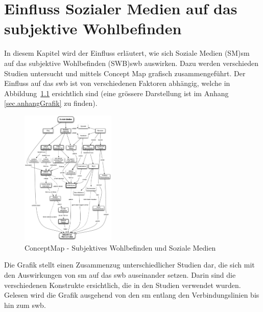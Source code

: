 %
%
\thispagestyle{empty}
\chapter{Einfluss Sozialer Medien auf das subjektive Wohlbefinden}\label{chap.einfluss}
\glsresetall
In diesem Kapitel wird der Einfluss erläutert, wie sich Soziale Medien (SM)\gls{sm} auf das subjektive Wohlbefinden (SWB)\gls{swb} auswirken. Dazu werden verschieden Studien untersucht und mittels Concept Map grafisch zusammengeführt. Der Einfluss auf das \gls{swb} ist von verschiedenen Faktoren abhängig, welche in Abbildung~\ref{fig.ConceptMapSwbSm} ersichtlich sind (eine grössere Darstellung ist im Anhang \ref{sec.anhangGrafik} zu finden).
\begin{figure}[h]
	\centering
		\includegraphics[width=0.4\textwidth]{images/grafiken/conceptMap_Swb_Sm_v2.pdf}
	\caption{ConceptMap - Subjektives Wohlbefinden und Soziale Medien}
	\label{fig.ConceptMapSwbSm}
\end{figure} \newline
Die Grafik stellt einen Zusammenzug unterschiedlicher Studien dar, die sich mit den Auswirkungen von \gls{sm} auf das \gls{swb} auseinander setzen. Darin sind die verschiedenen Konstrukte ersichtlich, die in den Studien verwendet wurden. Gelesen wird die Grafik ausgehend von den \gls{sm} entlang den Verbindungslinien bis hin zum \gls{swb}.\newline
